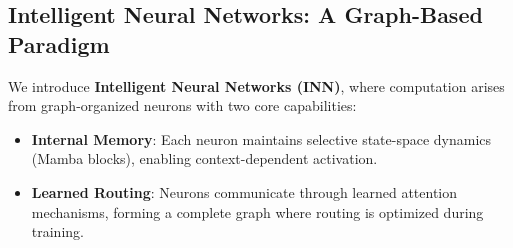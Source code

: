 \documentclass{article}
\begin{document}
\subsection{Intelligent Neural Networks: A Graph-Based Paradigm}

We introduce \textbf{Intelligent Neural Networks (INN)}, where computation arises from graph-organized neurons with two core capabilities:
\begin{itemize}
    \item \textbf{Internal Memory}: Each neuron maintains selective state-space dynamics (Mamba blocks), enabling context-dependent activation.
    \item \textbf{Learned Routing}: Neurons communicate through learned attention mechanisms, forming a complete graph where routing is optimized during training.
\end{itemize}
\end{document}
